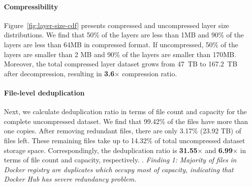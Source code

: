 
\paragraph{Compressibility}



Figure~\ref{fig:layer-size-cdf} presents compressed and uncompressed layer size
distributions.
%
%
We find that 50\% of the layers are less than 1MB and 90\% of the layers are
less than 64MB in compressed format.
%
If uncompressed, 50\% of the layers are smaller than 2 MB and 90\% of the
layers are smaller than 170MB.
%
%
Moreover, the total compressed layer dataset grows from 47~TB to 167.2~TB after decompression, resulting in \textbf{3.6$\times$} compression ratio.
%
%
%

\paragraph{File-level deduplication}
Next, we calculate deduplication ratio in terms of file count and capacity for
the complete uncompressed dataset. %
%
We find that 99.42\% of the files have more than one copies. 
%
%
%
%
After removing redundant files, there are only 3.17\% (23.92 TB) of files left. These remaining files take up to 14.32\% of total uncompressed dataset storage space.
%
Correspondingly, the deduplication ratio is \textbf{31.55$\times$} and \textbf{6.99$\times$} in terms of
file count and capacity, respectively.
%
.
%
%
\textit{Finding 1: Majority of files in Docker registry are duplicates which
occupy most of capacity, indicating that Docker Hub has severe redundancy
problem.}

